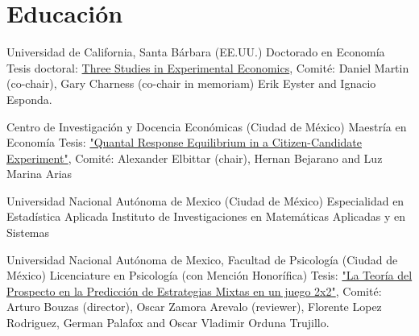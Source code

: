 \section{Educación}

{Universidad de California, Santa Bárbara (EE.UU.)}
{Doctorado en Economía}
{}{}
{Tesis doctoral: \href{https://escholarship.org/uc/item/8fj0g1tg}{Three Studies in Experimental Economics}, 
	Comité:
	Daniel Martin (co-chair),
	Gary Charness (co-chair in memoriam)
	Erik Eyster and
	Ignacio Esponda.
}

{Centro de Investigación y Docencia Económicas (Ciudad de México)}
{Maestría en Economía}
{}{}
{Tesis: \href{http://repositorio-digital.cide.edu/handle/11651/1719?show=full}{"Quantal Response Equilibrium in a Citizen-Candidate Experiment"}, 
	Comité: Alexander Elbittar (chair), Hernan Bejarano and Luz Marina Arias}

{Universidad Nacional Autónoma de Mexico (Ciudad de México)}
{Especialidad en Estadística Aplicada}
{}{}
{Instituto de Investigaciones en Matemáticas Aplicadas y en Sistemas }

{Universidad Nacional Autónoma de Mexico, Facultad de Psicología (Ciudad de México)}
{Licenciature en Psicología (con Mención Honorífica)}
{}{}
{Tesis: \href{http://132.248.9.195/ptd2013/noviembre/0706151/Index.html}{"La Teoría del Prospecto en la Predicción de Estrategias Mixtas en un juego 2x2"}, 
	Comité: Arturo Bouzas (director), Oscar Zamora Arevalo (reviewer), Florente Lopez Rodriguez, German Palafox and Oscar Vladimir Orduna Trujillo.} %






